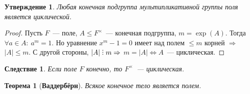 \documentclass[a4paper, 14pt]{extarticle}
\newcommand{\suchthat}{{:}{ } \ }
\DeclareRobustCommand{\divby}{%
	\mathrel{\text{\vbox{\baselineskip.65ex\lineskiplimit0pt\hbox{.}\hbox{.}\hbox{.}}}}%
}
\theoremstyle{definition}
\theoremstyle{plain}
\newtheorem*{theorem*}{Теорема}
\numberwithin{theorem}{section}
\numberwithin{definition}{section}
\newtheorem{statement}{Утверждение}
\numberwithin{statement}{section}
\numberwithin{lemma}{section}
\newtheorem*{consequence*}{Следствие}
\numberwithin{consequence}{section}
\begin{document}
        \begin{statement}
            Любая конечная подгруппа мультипликативной группы поля является циклической.
        \end{statement}
        \begin{proof}
            Пусть $F$~--- поле, ${A \leqslant F^\times}$~--- конечная подгруппа, ${m = \exp(A).}$ Тогда ${\forall a \in A\suchthat a^m = 1.}$ Но уравнение ${x^m - 1 = 0}$ имеет над полем $\leqslant m$ корней $\Rightarrow$ ${|A| \leqslant m}$. С другой стороны, ${|A| \divby m \Rightarrow}$ ${m = |A| \Leftrightarrow A}$~--- циклическая.
        \end{proof}
        \begin{consequence*}
            Если поле $F$ конечно, то $F^\times$~--- циклическая.
        \end{consequence*}
        \begin{theorem*}[\textbf{Ваддербёрн}]
            Всякое конечное тело является полем.
        \end{theorem*}
\end{document}
